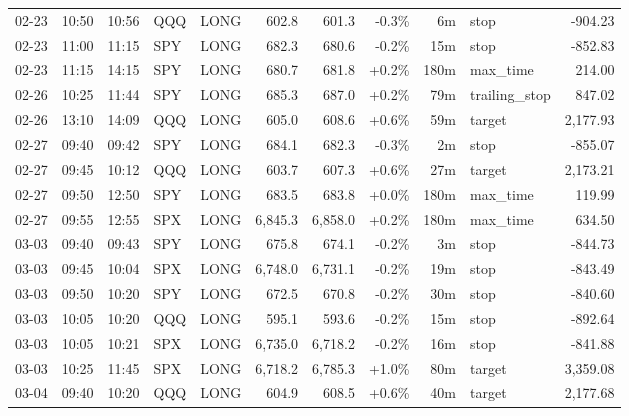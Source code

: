 \documentclass[11pt,a4paper,twoside]{article}
\begin{document}
\begin{center}
\begin{longtable}{>{\color{txtmain}}l l l l l r r r r >{\color{txtmain}}l r}
02-23 & 10:50 & 10:56 & QQQ & LONG & 602.8 & 601.3 & \textcolor{lossred}{-0.3\%} & 6m & stop & \textcolor{lossred}{-904.23} \\
02-23 & 11:00 & 11:15 & SPY & LONG & 682.3 & 680.6 & \textcolor{lossred}{-0.2\%} & 15m & stop & \textcolor{lossred}{-852.83} \\
02-23 & 11:15 & 14:15 & SPY & LONG & 680.7 & 681.8 & \textcolor{wingreen}{+0.2\%} & 180m & max\_time & \textcolor{wingreen}{214.00} \\
02-26 & 10:25 & 11:44 & SPY & LONG & 685.3 & 687.0 & \textcolor{wingreen}{+0.2\%} & 79m & trailing\_stop & \textcolor{wingreen}{847.02} \\
02-26 & 13:10 & 14:09 & QQQ & LONG & 605.0 & 608.6 & \textcolor{wingreen}{+0.6\%} & 59m & target & \textcolor{wingreen}{2,177.93} \\
02-27 & 09:40 & 09:42 & SPY & LONG & 684.1 & 682.3 & \textcolor{lossred}{-0.3\%} & 2m & stop & \textcolor{lossred}{-855.07} \\
02-27 & 09:45 & 10:12 & QQQ & LONG & 603.7 & 607.3 & \textcolor{wingreen}{+0.6\%} & 27m & target & \textcolor{wingreen}{2,173.21} \\
02-27 & 09:50 & 12:50 & SPY & LONG & 683.5 & 683.8 & \textcolor{wingreen}{+0.0\%} & 180m & max\_time & \textcolor{wingreen}{119.99} \\
02-27 & 09:55 & 12:55 & SPX & LONG & 6,845.3 & 6,858.0 & \textcolor{wingreen}{+0.2\%} & 180m & max\_time & \textcolor{wingreen}{634.50} \\
03-03 & 09:40 & 09:43 & SPY & LONG & 675.8 & 674.1 & \textcolor{lossred}{-0.2\%} & 3m & stop & \textcolor{lossred}{-844.73} \\
03-03 & 09:45 & 10:04 & SPX & LONG & 6,748.0 & 6,731.1 & \textcolor{lossred}{-0.2\%} & 19m & stop & \textcolor{lossred}{-843.49} \\
03-03 & 09:50 & 10:20 & SPY & LONG & 672.5 & 670.8 & \textcolor{lossred}{-0.2\%} & 30m & stop & \textcolor{lossred}{-840.60} \\
03-03 & 10:05 & 10:20 & QQQ & LONG & 595.1 & 593.6 & \textcolor{lossred}{-0.2\%} & 15m & stop & \textcolor{lossred}{-892.64} \\
03-03 & 10:05 & 10:21 & SPX & LONG & 6,735.0 & 6,718.2 & \textcolor{lossred}{-0.2\%} & 16m & stop & \textcolor{lossred}{-841.88} \\
03-03 & 10:25 & 11:45 & SPX & LONG & 6,718.2 & 6,785.3 & \textcolor{wingreen}{+1.0\%} & 80m & target & \textcolor{wingreen}{3,359.08} \\
03-04 & 09:40 & 10:20 & QQQ & LONG & 604.9 & 608.5 & \textcolor{wingreen}{+0.6\%} & 40m & target & \textcolor{wingreen}{2,177.68} \\

\end{longtable}
\end{center}
\end{document}
